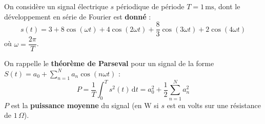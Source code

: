 \documentclass[a4paper,11pt]{article}
\newcommand{\dt}{\mathrm{d}t}
\begin{document}
\newpage

\begin{tcolorbox}[exobox={Exercice 3 \hfill \normalfont\textit{(10 points)}}]
On considère un signal électrique $s$ périodique de période $T = 1\,\mathrm{ms}$,
dont le développement en série de Fourier est \textbf{donné} :
\[
  s(t) = 3 + 8\cos(\omega t) + 4\cos(2\omega t) + \frac{8}{3}\cos(3\omega t) + 2\cos(4\omega t)
\]
où $\omega = \dfrac{2\pi}{T}$.

\smallskip
On rappelle le \textbf{théorème de Parseval} pour un signal de la forme
$S(t) = a_0 + \displaystyle\sum_{n=1}^{N}a_n\cos(n\omega t)$ :
\[
  P = \frac{1}{T}\int_0^T s^2(t)\,\dt = a_0^2 + \frac{1}{2}\sum_{n=1}^{N} a_n^2
\]
$P$ est la \textbf{puissance moyenne} du signal (en $\mathrm{W}$ si $s$ est en volts sur une résistance de $1\,\Omega$).
\end{tcolorbox}
\end{document}
